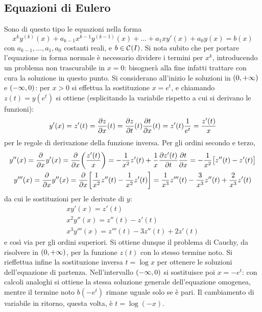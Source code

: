\subsection*{Equazioni di Eulero}
Sono di questo tipo le equazioni nella forma
\begin{equation} \label{eq:eulero}
x^ky^{(k)}(x)+a_{k-1}x^{k-1}y^{(k-1)}(x)+\dots+a_1xy'(x)+a_0y(x)=b(x)
\end{equation}
con $a_{k-1},\dots,a_1,a_0$ costanti reali, e $b\in\mathcal{C}^{{}}(I)$.
Si nota subito che per portare l'equazione in forma normale è necessario dividere i termini per $x^k$, introducendo un problema non trascurabile in $x=0$: bisognerà alla fine infatti trattare con cura la soluzione in questo punto. Si considerano all'inizio le soluzioni in $(0,+\infty)$ e $(-\infty,0)$: per $x>0$ si effettua la sostituzione $x=e^t$, e chiamando $z(t)=y(e^t)$ si ottiene (esplicitando la variabile rispetto a cui si derivano le funzioni):
\[
y'(x)=z'(t)=\frac{\partial {z}}{\partial {x}}(t)=\frac{\partial {z}}{\partial {t}}(t)\frac{\partial {t}}{\partial {x}}(t)=z'(t)\frac1{e^t}=\frac{z'(t)}{x}
\]
per le regole di derivazione della funzione inversa.
Per gli ordini secondo e terzo,
\begin{gather*}
y''(x)=\frac{\partial {}}{\partial {x}}y'(x)=\frac{\partial {}}{\partial {x}}\bigg(\frac{z'(t)}{x}\bigg)=-\frac1{x^2}z'(t)+\frac1{x}\frac{\partial {z'(t)}}{\partial {t}}\frac{\partial {t}}{\partial {x}}=-\frac1{x^2}\big[z''(t)-z'(t)\big]\\
y'''(x)=\frac{\partial {}}{\partial {x}}y''(x)=\frac{\partial {}}{\partial {x}}\bigg[\frac1{x^2}z''(t)-\frac1{x^2}z'(t)\bigg]=\frac1{x^3}z'''(t)-\frac3{x^3}z''(t)+\frac2{x^3}z'(t)
\end{gather*}
da cui le sostituzioni per le derivate di $y$:
\begin{equation} \label{eq:sostituzioni_eulero}
\begin{gathered}
xy'(x)=z'(t)\\
x^2y''(x)=z''(t)-z'(t)\\
x^3y'''(x)=z'''(t)-3z''(t)+2z'(t)
\end{gathered}
\end{equation}
e così via per gli ordini superiori.
Si ottiene dunque il problema di Cauchy, da risolvere in $(0,+\infty)$, per la funzione $z(t)$ con lo stesso termine noto. Si rieffettua infine la sostituzione inversa $t=\log x$ per ottenere le soluzioni dell'equazione di partenza.
Nell'intervallo $(-\infty,0)$ si sostituisce poi $x=-e^t$: con calcoli analoghi si ottiene la stessa soluzione generale dell'equazione omogenea, mentre il termine noto $b(-e^t)$ rimane uguale solo se è pari. Il cambiamento di variabile in ritorno, questa volta, è $t=\log(-x)$.

